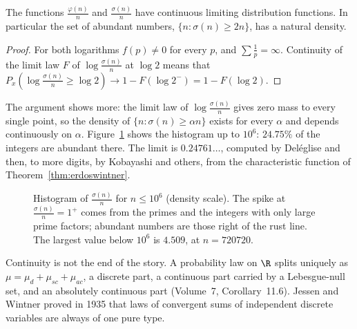\begin{corollary}\label{cor:phicont}
The functions $\frac{\varphi(n)}n$ and $\frac{\sigma(n)}n$ have continuous limiting distribution functions. In particular the set of abundant numbers, $\{n:\sigma(n)\ge2n\}$, has a natural density.
\end{corollary}
\begin{proof}
For both logarithms $f(p)\ne0$ for every $p$, and $\sum\frac1p=\infty$. Continuity of the limit law $F$ of $\log\frac{\sigma(n)}n$ at $\log2$ means that $P_x(\log\frac{\sigma(n)}n\ge\log2)\to1-F(\log2^-)=1-F(\log2)$.
\end{proof}

The argument shows more: the limit law of $\log\frac{\sigma(n)}n$ gives zero mass to every single point, so the density of $\{n:\sigma(n)\ge\alpha n\}$ exists for every $\alpha$ and depends continuously on $\alpha$. Figure~\ref{fig:sigma} shows the histogram up to $10^6$: $24.75\%$ of the integers are abundant there. The limit is $0.24761\ldots$, computed by Deléglise and then, to more digits, by Kobayashi and others, from the characteristic function of Theorem~\ref{thm:erdoswintner}.

\begin{figure}[ht]
\centering{}
\caption{Histogram of $\frac{\sigma(n)}n$ for $n\le10^6$ (density scale). The spike at $\frac{\sigma(n)}n=1^+$ comes from the primes and the integers with only large prime factors; abundant numbers are those right of the rust line. The largest value below $10^6$ is $4.509$, at $n=720720$.}
\label{fig:sigma}
\end{figure}

Continuity is not the end of the story. A probability law on $\R$ splits uniquely as $\mu=\mu_d+\mu_{sc}+\mu_{ac}$, a discrete part, a continuous part carried by a Lebesgue-null set, and an absolutely continuous part (Volume~7, Corollary~11.6). Jessen and Wintner proved in 1935 that laws of convergent sums of independent discrete variables are always of one pure type.


